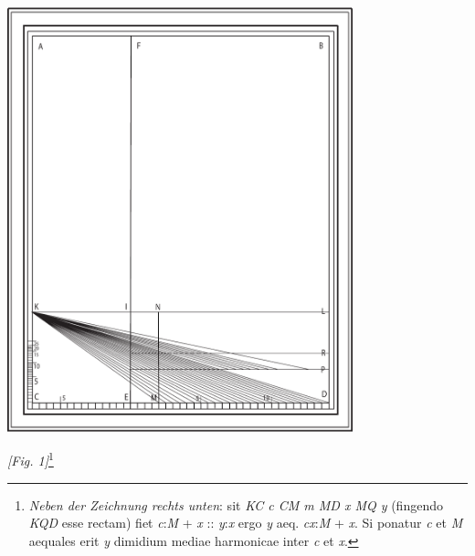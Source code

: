 \pend \newpage [p.~71]
\begin{center}
\includegraphics[width=0.75\textwidth]{images/Aleaume_71}
\\\rule[-4mm]{0mm}{10mm}\textit{[Fig. 1]}\footnote{\textit{Neben der Zeichnung rechts unten}: sit \textit{KC c CM m  MD x  MQ y} (fingendo \textit{KQD} esse rectam) fiet \textit{c}:\textit{M} + \textit{x} :: \textit{y}:\textit{x} ergo \textit{y} aeq. \textit{cx}:\textit{M} + \textit{x}. Si ponatur \textit{c} et \textit{M} aequales erit \textit{y} dimidium mediae harmonicae inter \textit{c} et \textit{x}.}
\end{center}
\pstart
\newpage